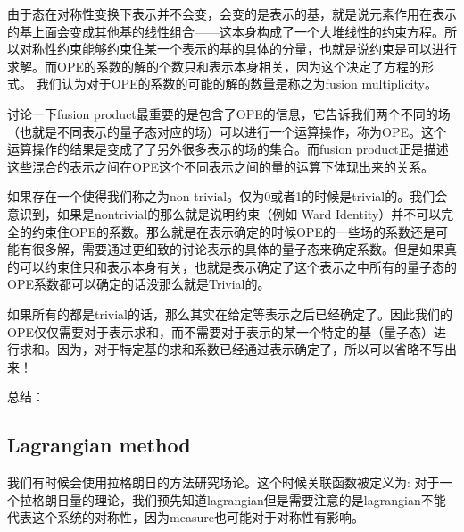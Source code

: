 
由于态在对称性变换下表示并不会变，会变的是表示的基，就是说元素作用在表示的基上面会变成其他基的线性组合——这本身构成了一个大堆线性的约束方程。所以对称性约束能够约束住某一个表示的基的具体的分量，也就是说约束是可以进行求解。而OPE的系数的解的个数只和表示本身相关，因为这个决定了方程的形式。
我们认为对于OPE的系数的可能的解的数量是称之为fusion multiplicity。

讨论一下fusion product最重要的是包含了OPE的信息，它告诉我们两个不同的场（也就是不同表示的量子态对应的场）可以进行一个运算操作，称为OPE。这个运算操作的结果是变成了了另外很多表示的场的集合。而fusion product正是描述这些混合的表示之间在OPE这个不同表示之间的量的运算下体现出来的关系。

如果存在一个使得我们称之为non-trivial。仅为0或者1的时候是trivial的。我们会意识到，如果是nontrivial的那么就是说明约束（例如 Ward Identity）并不可以完全的约束住OPE的系数。那么就是在表示确定的时候OPE的一些场的系数还是可能有很多解，需要通过更细致的讨论表示的具体的量子态来确定系数。但是如果真的可以约束住只和表示本身有关，也就是表示确定了这个表示之中所有的量子态的OPE系数都可以确定的话没那么就是Trivial的。

如果所有的都是trivial的话，那么其实在给定等表示之后已经确定了。因此我们的OPE仅仅需要对于表示求和，而不需要对于表示的某一个特定的基（量子态）进行求和。因为，对于特定基的求和系数已经通过表示确定了，所以可以省略不写出来！




总结：

\subsection{Lagrangian method}
我们有时候会使用拉格朗日的方法研究场论。这个时候关联函数被定义为:
对于一个拉格朗日量的理论，我们预先知道lagrangian但是需要注意的是lagrangian不能代表这个系统的对称性，因为measure也可能对于对称性有影响。

